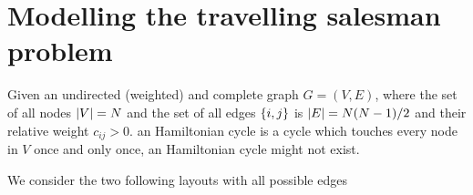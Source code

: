 \section{Modelling the travelling salesman problem}\label{sc:tsp}

Given an undirected (weighted) and complete graph $G=(V,E)$, where the set of all nodes $\lvert V\rvert=N$ and the set of all edges $\{i,j\}$ is $\lvert E\rvert=N(N-1)/2$ and their relative weight $c_{ij}>0$. an Hamiltonian cycle is a cycle which touches every node in $V$ once and only once, an Hamiltonian cycle might not exist.

We consider the two following layouts with all possible edges

